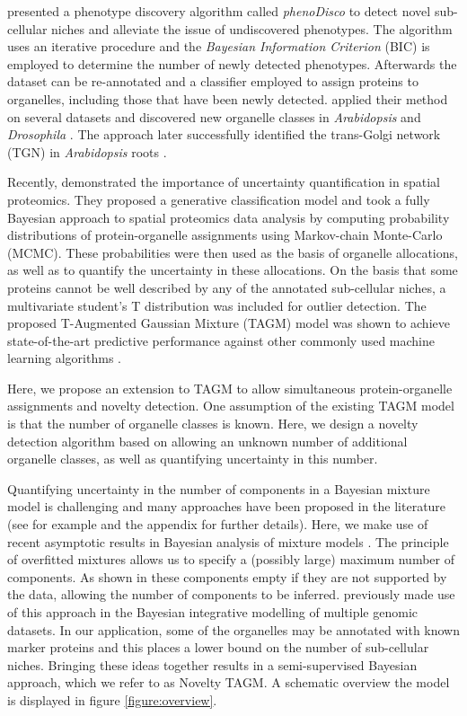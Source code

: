 \documentclass[12pt,english]{article}
\begin{document}
\cite{Breckels:2013} presented a phenotype discovery algorithm called \textit{phenoDisco} to detect novel sub-cellular niches and alleviate the issue of undiscovered phenotypes. The algorithm uses an iterative procedure and the \textit{Bayesian Information Criterion} (BIC) \citep{Schwarz::1978} is employed to determine the number of newly detected phenotypes. Afterwards the dataset can be re-annotated and a classifier employed to assign proteins to organelles, including those that have been newly detected. \cite{Breckels:2013} applied their method on several datasets and discovered new organelle classes in \textit{Arabidopsis} \citep{Dunkley:2006} and \textit{Drosophila} \citep{Tan:2009}. The approach later successfully identified the trans-Golgi network (TGN) in \textit{Arabidopsis} roots \citep{Groen:2014}.

Recently, \cite{Crook:2018} demonstrated the importance of uncertainty quantification in spatial proteomics. They proposed a generative classification model and took a fully Bayesian approach to spatial proteomics data analysis by computing probability distributions of protein-organelle assignments using Markov-chain Monte-Carlo (MCMC). These probabilities were then used as the basis of organelle allocations, as well as to quantify the uncertainty in these allocations. On the basis that some proteins cannot be well described by any of the annotated sub-cellular niches, a multivariate student's T distribution was included for outlier detection. The proposed T-Augmented Gaussian Mixture (TAGM) model was shown to achieve state-of-the-art predictive performance against other commonly used machine learning algorithms \citep{Crook:2018}. 

Here, we propose an extension to TAGM to allow simultaneous protein-organelle assignments and novelty detection. One assumption of the existing TAGM model is that the number of organelle classes is known. Here, we design a novelty detection algorithm based on allowing an unknown number of additional organelle classes, as well as quantifying uncertainty in this number.

Quantifying uncertainty in the number of components in a Bayesian mixture model is challenging and many approaches have been proposed in the literature (see for example \cite{ferguson::1974, antoniak::1974, Richardson::1997} and the appendix for further details). Here, we make use of recent asymptotic results in Bayesian analysis of mixture models \citep{Rousseau::2011}. The principle of overfitted mixtures allows us to specify a (possibly large) maximum number of components. As shown in \cite{Rousseau::2011} these components empty if they are not supported by the data, allowing the number of components to be inferred. \cite{Kirk:2012} previously made use of this approach in the Bayesian integrative modelling of multiple genomic datasets. In our application, some of the organelles may be annotated with known marker proteins and this places a lower bound on the number of sub-cellular niches. Bringing these ideas together results in a semi-supervised Bayesian approach, which we refer to as Novelty TAGM. A schematic overview the model is displayed in figure \ref{figure:overview}. 
\end{document}
